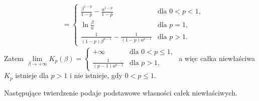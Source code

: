 \documentclass[leqno]{article}
\begin{document}
\begin{justify}
\begin{ex}
\begin{itemize}
\begin{align*}
                &= 
                \begin{cases}
                    \frac{\beta^{1-p}}{1-p} - \frac{a^{1-p}}{1-p} & \text{dla } 0 < p < 1, \\
                    \ln \frac{\beta}{a} & \text{dla } p = 1, \\
                    \frac{1}{(1-p)\beta^{p-1}} - \frac{1}{(1-p)a^{p-1}} &\text{dla } p > 1.
                \end{cases}
            \end{align*}
            Zatem $\lim\limits_{\beta \to +\infty} K_p(\beta) = 
                \begin{cases}
                    +\infty &\text{dla } 0 < p \leqslant 1, \\
                    \frac{1}{(p-1)a^{p-1}} &\text{dla } p > 1,
                \end{cases}$ a więc całka niewłaściwa $K_p$ istnieje dla $p > 1$ i nie istnieje, gdy $0 < p \leqslant 1$.
    \end{itemize}
\end{ex}

Następujące twierdzenie podaje podstawowe własności całek niewłaściwych.


\end{justify}
\end{document}
